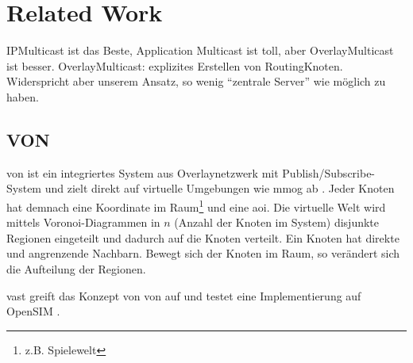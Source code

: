 \chapter{Related Work}
\label{chap:related}

IPMulticast ist das Beste, Application Multicast ist toll, aber OverlayMulticast ist besser. OverlayMulticast: explizites Erstellen von RoutingKnoten. Widerspricht aber unserem Ansatz, so wenig ``zentrale Server'' wie möglich zu haben. 

\cite{Lao2005Comparative} %








\section{VON}
\label{chap:related:von}
\ac{von} ist ein integriertes System aus Overlaynetzwerk mit Publish/Subscribe-System und zielt direkt auf virtuelle Umgebungen wie \ac{mmog} ab \cite{Hu2006VON}. Jeder Knoten hat demnach eine Koordinate im Raum\footnote{z.B. Spielewelt} und eine \ac{aoi}. Die virtuelle Welt wird mittels Voronoi-Diagrammen in $n$ (Anzahl der Knoten im System) disjunkte Regionen eingeteilt und dadurch auf die Knoten verteilt. Ein Knoten hat direkte und angrenzende Nachbarn. Bewegt sich der Knoten im Raum, so verändert sich die Aufteilung der Regionen.

\ac{vast} \cite{Backhaus2007Voronoibased} greift das Konzept von \ac{von} auf und testet eine Implementierung auf OpenSIM \cite{Baumgart2007OverSim}.


